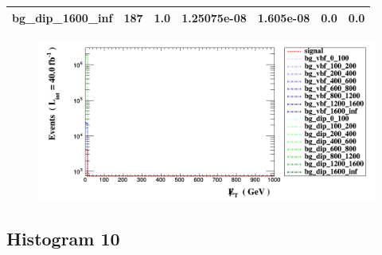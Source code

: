 \documentclass[a4paper, 10pt]{article}
\begin{document}
\begin{table}[H]
\begin{center}
\begin{tabular}{|m{23.0mm}|m{23.0mm}|m{18.0mm}|m{19.0mm}|m{19.0mm}|m{19.0mm}|m{19.0mm}|}
      \hline
      {\cellcolor{white}         bg\_dip\_1600\_inf}& {\cellcolor{white}         187}& {\cellcolor{white}         1.0}& {\cellcolor{white}         1.25075e-08}& {\cellcolor{white}         1.605e-08}& {\cellcolor{green}         0.0}& {\cellcolor{green}         0.0}\\
\hline
    \end{tabular}
  \end{center}
\end{table}

\begin{figure}[H]
  \begin{center}
    \includegraphics[scale=0.45]{selection_8.png}\\
\caption{   }
  \end{center}
\end{figure}
      \newpage
\subsection{ Histogram 10}
\end{document}

